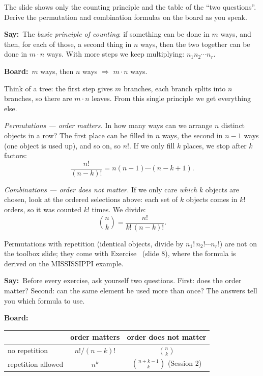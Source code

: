 \documentclass[11pt,a4paper,parskip=half]{scrartcl}
\newcommand{\say}{\textbf{\color{teal}Say:}\ }
\newcommand{\board}{\textbf{\color{gold}Board:}\ }
\begin{document}
\begin{cue}
	The slide shows only the counting principle and the table of the ``two
	questions''. Derive the permutation and combination formulas on the board
	as you speak.
\end{cue}

\say The \emph{basic principle of counting}: if something can be done in
$m$ ways, and then, for each of those, a second thing in $n$ ways, then the
two together can be done in $m\cdot n$ ways. With more steps we keep
multiplying: $n_1 n_2\cdots n_r$.

\board $m$ ways, then $n$ ways $\Rightarrow$ $m\cdot n$ ways.

Think of a tree: the first step gives $m$ branches, each branch splits
into $n$ branches, so there are $m\cdot n$ leaves. From this single principle
we get everything else.

\emph{Permutations --- order matters.} In how many ways can we arrange $n$
distinct objects in a row? The first place can be filled in $n$ ways, the
second in $n-1$ ways (one object is used up), and so on, so $n!$. If we only
fill $k$ places, we stop after $k$ factors:
\[ \frac{n!}{(n-k)!} = n(n-1)\cdots(n-k+1). \]

\emph{Combinations --- order does not matter.} If we only care \emph{which}
$k$ objects are chosen, look at the ordered selections above: each set of
$k$ objects comes in $k!$ orders, so it was counted $k!$ times. We divide:
\[ \binom nk = \frac{n!}{k!\,(n-k)!}. \]

\begin{cue}
	Permutations with repetition (identical objects, divide by
	$n_1!\,n_2!\cdots n_r!$) are not on the toolbox slide; they come with
	Exercise~ (slide 8), where the formula is
	derived on the MISSISSIPPI example.
\end{cue}

\say Before every exercise, ask yourself two questions. First: does the order
matter? Second: can the same element be used more than once? The answers tell
you which formula to use.

\board
\begin{tabular}{lcc}
	\toprule
	                   & order matters & order does not matter          \\\midrule
	no repetition      & $n!/(n-k)!$   & $\binom nk$                    \\
	repetition allowed & $n^k$         & $\binom{n+k-1}{k}$ (Session 2) \\\bottomrule
\end{tabular}
\end{document}
